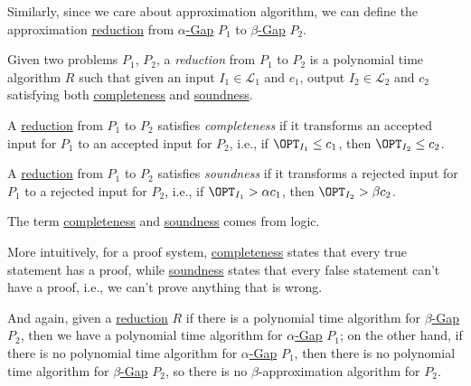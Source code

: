Similarly, since we care about approximation algorithm, we can define the approximation \hyperref[def:reduction]{reduction} from \hyperref[def:Gap]{\(\alpha \)-Gap} \(P_1\) to \hyperref[def:Gap]{\(\beta \)-Gap} \(P_2\).

\begin{definition}[Reduction]\label{def:reduction}
	Given two problems \(P_1\), \(P_2\), a \emph{reduction} from \(P_1\) to \(P_2\) is a polynomial time algorithm \(R\) such that given an input \(I_1\in \mathcal{L}_1 \) and \(c_1\), output \(I_2\in \mathcal{L} _2\) and \(c_2\) satisfying both \hyperref[def:completeness]{completeness} and \hyperref[def:soundness]{soundness}.
	\begin{definition}[Completeness]\label{def:completeness}
		A \hyperref[def:reduction]{reduction} from \(P_1\) to \(P_2\) satisfies \emph{completeness} if it transforms an accepted input for \(P_1\) to an accepted input for \(P_2\), i.e., if \(\OPT_{I_1}\leq c_1\), then \(\OPT_{I_2}\leq c_2\).
	\end{definition}
	\begin{definition}[Soundness]\label{def:soundness}
		A \hyperref[def:reduction]{reduction} from \(P_1\) to \(P_2\) satisfies \emph{soundness} if it transforms a rejected input for \(P_1\) to a rejected input for \(P_2\), i.e., if \(\OPT_{I_1}> \alpha c_1\), then \(\OPT_{I_2}> \beta c_2\).
	\end{definition}
\end{definition}

\begin{remark}
	The term \hyperref[def:completeness]{completeness} and \hyperref[def:soundness]{soundness} comes from logic.
\end{remark}
\begin{explanation}
	More intuitively, for a proof system, \hyperref[def:completeness]{completeness} states that every true statement has a proof, while \hyperref[def:soundness]{soundness} states that every false statement can't have a proof, i.e., we can't prove anything that is wrong.
\end{explanation}

And again, given a \hyperref[def:reduction]{reduction} \(R\) if there is a polynomial time algorithm for \hyperref[def:Gap]{\(\beta \)-Gap} \(P_2\), then we have a polynomial time algorithm for \hyperref[def:Gap]{\(\alpha \)-Gap} \(P_1\); on the other hand, if there is no polynomial time algorithm for \hyperref[def:Gap]{\(\alpha \)-Gap} \(P_1\), then there is no polynomial time algorithm for \hyperref[def:Gap]{\(\beta \)-Gap} \(P_2\), so there is no \(\beta \)-approximation algorithm for \(P_2\).

